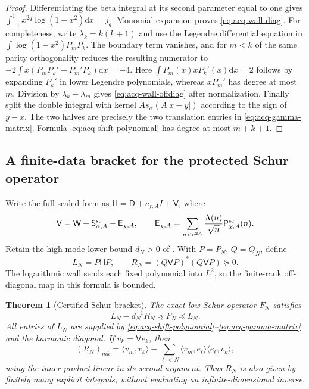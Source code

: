 \documentclass[11pt]{article}
\newtheorem{theorem}{Theorem}[section]
\theoremstyle{definition}
\theoremstyle{remark}
\newcommand{\dd}{\mathrm d}
\begin{document}
\begin{proof}
Differentiating the beta integral at its second parameter equal to one
gives $\int_{-1}^1x^{2q}\log(1-x^2)\dd x=j_q$.
Monomial expansion proves \eqref{eq:acq-wall-diag}.  For completeness,
write $\lambda_k=k(k+1)$ and use the Legendre differential equation in
$\int\log(1-x^2)P_mP_k$.  The boundary term vanishes, and for $m<k$
of the same parity orthogonality reduces the resulting numerator to
$-2\int x(P_mP_k'-P_m'P_k)\dd x=-4$.
Here $\int P_m(x)xP_k'(x)\dd x=2$ follows by expanding $P_k'$ in
lower Legendre polynomials, whereas $xP_m'$ has degree at most $m$.
Division by $\lambda_k-\lambda_m$ gives
\eqref{eq:acq-wall-offdiag} after normalization.  Finally split the
double integral with kernel $A s_\alpha(A|x-y|)$ according to the sign
of $y-x$.  The two halves are precisely the two translation entries in
\eqref{eq:acq-gamma-matrix}.  Formula
\eqref{eq:acq-shift-polynomial} has degree at most $m+k+1$.
\end{proof}

\subsection{A finite-data bracket for the protected Schur operator}
\label{subsec:weil-schur-bracket}

Write the full scaled form as
$\mathsf H=\mathsf D+c_{f,A}I+\mathsf V$, where
\begin{equation}
 \mathsf V=\mathsf W+\mathsf S_{\alpha,A}^{\rm sc}
 -\mathsf E_{\chi,A},\qquad
 \mathsf E_{\chi,A}=\sum_{n<e^{2A}}\frac{\Lambda(n)}{\sqrt n}
                   \mathsf P_{\chi,A}^{\rm sc}(n).
 \label{eq:acq-complete-V}
\end{equation}
Retain the high-mode lower bound $d_N>0$ of
.  With $P=P_N$, $Q=Q_N$, define
\begin{equation}
 L_N=P\mathsf HP,\qquad
 R_N=(Q\mathsf VP)^*(Q\mathsf VP)\succeq0.
 \label{eq:acq-LR}
\end{equation}
The logarithmic wall sends each fixed polynomial into $L^2$, so the
finite-rank off-diagonal map in this formula is bounded.

\begin{theorem}[Certified Schur bracket]
\label{thm:acq-schur-bracket}
The exact low Schur operator $F_N$ satisfies
\begin{equation}
 \boxed{L_N-d_N^{-1}R_N\preceq F_N\preceq L_N.}
 \label{eq:acq-schur-bracket}
\end{equation}
All entries of $L_N$ are supplied by
\eqref{eq:acq-shift-polynomial}--\eqref{eq:acq-gamma-matrix} and the
harmonic diagonal.  If $v_k=\mathsf V e_k$, then
\begin{equation}
 (R_N)_{mk}=\langle v_m,v_k\rangle
 -\sum_{\ell<N}\langle v_m,e_\ell\rangle
                     \langle e_\ell,v_k\rangle,
 \label{eq:acq-tail-gram}
\end{equation}
using the inner product linear in its second argument.  Thus $R_N$ is
also given by finitely many explicit integrals, without evaluating an
infinite-dimensional inverse.
\end{theorem}
\end{document}
